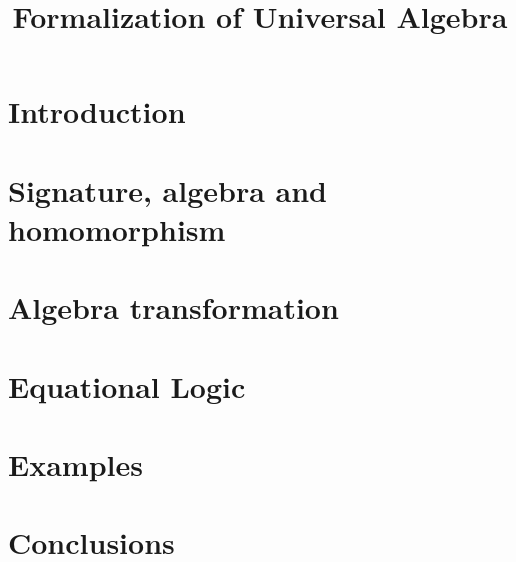 \documentclass[a4paper,twoside,12pt]{article}
\begin{document}
\title{Formalization of Universal Algebra}

\date{}

\maketitle

\section{Introduction}

\section{Signature, algebra and homomorphism}

\section{Algebra transformation}

\section{Equational Logic}

\section{Examples}

\section{Conclusions}
\end{document}
